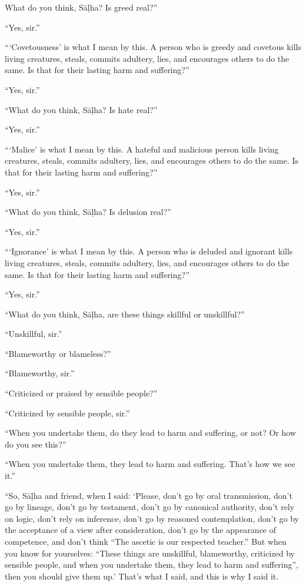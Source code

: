 \documentclass[12pt,openany]{book}%
\begin{document}
What do you think, \textsanskrit{Sāḷha}? Is greed real?” 

“Yes, sir.” 

“‘Covetousness’ is what I mean by this. A person who is greedy and covetous kills living creatures, steals, commits adultery, lies, and encourages others to do the same. Is that for their lasting harm and suffering?” 

“Yes, sir.” 

“What do you think, \textsanskrit{Sāḷha}? Is hate real?” 

“Yes, sir.” 

“‘Malice’ is what I mean by this. A hateful and malicious person kills living creatures, steals, commits adultery, lies, and encourages others to do the same. Is that for their lasting harm and suffering?” 

“Yes, sir.” 

“What do you think, \textsanskrit{Sāḷha}? Is delusion real?” 

“Yes, sir.” 

“‘Ignorance’ is what I mean by this. A person who is deluded and ignorant kills living creatures, steals, commits adultery, lies, and encourages others to do the same. Is that for their lasting harm and suffering?” 

“Yes, sir.” 

“What do you think, \textsanskrit{Sāḷha}, are these things skillful or unskillful?” 

“Unskillful, sir.” 

“Blameworthy or blameless?” 

“Blameworthy, sir.” 

“Criticized or praised by sensible people?” 

“Criticized by sensible people, sir.” 

“When you undertake them, do they lead to harm and suffering, or not? Or how do you see this?” 

“When you undertake them, they lead to harm and suffering. That’s how we see it.” 

“So, \textsanskrit{Sāḷha} and friend, when I said: ‘Please, don’t go by oral transmission, don’t go by lineage, don’t go by testament, don’t go by canonical authority, don’t rely on logic, don’t rely on inference, don’t go by reasoned contemplation, don’t go by the acceptance of a view after consideration, don’t go by the appearance of competence, and don’t think “The ascetic is our respected teacher.” But when you know for yourselves: “These things are unskillful, blameworthy, criticized by sensible people, and when you undertake them, they lead to harm and suffering”, then you should give them up.’ That’s what I said, and this is why I said it. 
\end{document}
